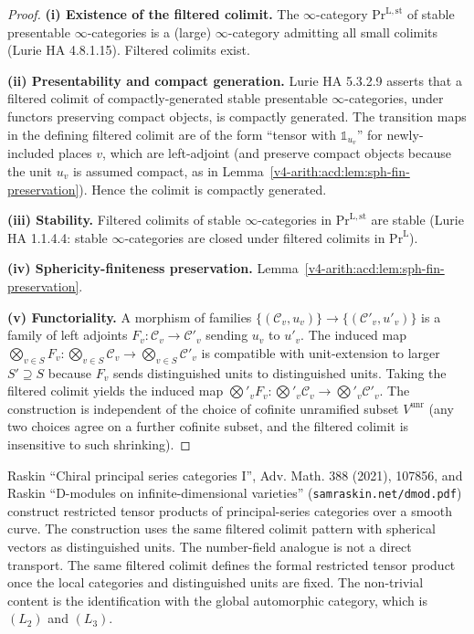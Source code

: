 \begin{proof}
\textbf{(i) Existence of the filtered colimit.} The \(\infty\)-category
\(\mathrm{Pr}^{\mathrm{L,st}}\) of stable presentable \(\infty\)-categories
is a (large) \(\infty\)-category admitting all small colimits (Lurie
HA 4.8.1.15). Filtered colimits exist.

\textbf{(ii) Presentability and compact generation.} Lurie HA
5.3.2.9 asserts that a filtered colimit of compactly-generated
stable presentable \(\infty\)-categories, under functors preserving
compact objects, is compactly generated. The transition maps in the
defining filtered colimit are of the form ``tensor with
\(\mathbb{1}_{u_{v}}\)'' for newly-included places \(v\), which are
left-adjoint (and preserve compact objects because the unit \(u_{v}\)
is assumed compact, as in
Lemma~\ref{v4-arith:acd:lem:sph-fin-preservation}). Hence the colimit is
compactly generated.

\textbf{(iii) Stability.} Filtered colimits of stable
\(\infty\)-categories in \(\mathrm{Pr}^{\mathrm{L,st}}\) are stable
(Lurie HA 1.1.4.4: stable \(\infty\)-categories are closed under
filtered colimits in \(\mathrm{Pr}^{\mathrm{L}}\)).

\textbf{(iv) Sphericity-finiteness preservation.}
Lemma~\ref{v4-arith:acd:lem:sph-fin-preservation}.

\textbf{(v) Functoriality.} A morphism of families
\(\{(\mathcal{C}_{v}, u_{v})\}\to\{(\mathcal{C}'_{v}, u'_{v})\}\) is a
family of left adjoints \(F_{v}:\mathcal{C}_{v}\to\mathcal{C}'_{v}\)
sending \(u_{v}\) to \(u'_{v}\). The induced map
\(\bigotimes_{v\in S}F_{v}:\bigotimes_{v\in S}\mathcal{C}_{v}\to\bigotimes_{v\in S}\mathcal{C}'_{v}\)
is compatible with unit-extension to larger \(S'\supseteq S\) because
\(F_{v}\) sends distinguished units to distinguished units. Taking the
filtered colimit yields the induced map
\(\bigotimes'_{v}F_{v}:\bigotimes'_{v}\mathcal{C}_{v}\to\bigotimes'_{v}\mathcal{C}'_{v}\).
The construction is independent of the choice of cofinite unramified
subset \(V^{\mathrm{unr}}\) (any two choices agree on a further
cofinite subset, and the filtered colimit is insensitive to such
shrinking).
\end{proof}

\begin{remark}
\label{v4-arith:acd:rem:raskin-comparison}
Raskin ``Chiral principal series categories I'', Adv. Math. 388
(2021), 107856, and Raskin ``D-modules on infinite-dimensional
varieties'' (\texttt{samraskin.net/dmod.pdf}) construct
restricted tensor products of principal-series categories over a
smooth curve. The construction uses the same filtered colimit
pattern with spherical vectors as distinguished units. The
number-field analogue is not a direct transport.  The same filtered
colimit defines the formal restricted tensor product once the local
categories and distinguished units are fixed.  The non-trivial content
is the identification with the global automorphic category, which is
\((L_{2})\) and \((L_{3})\).
\end{remark}

